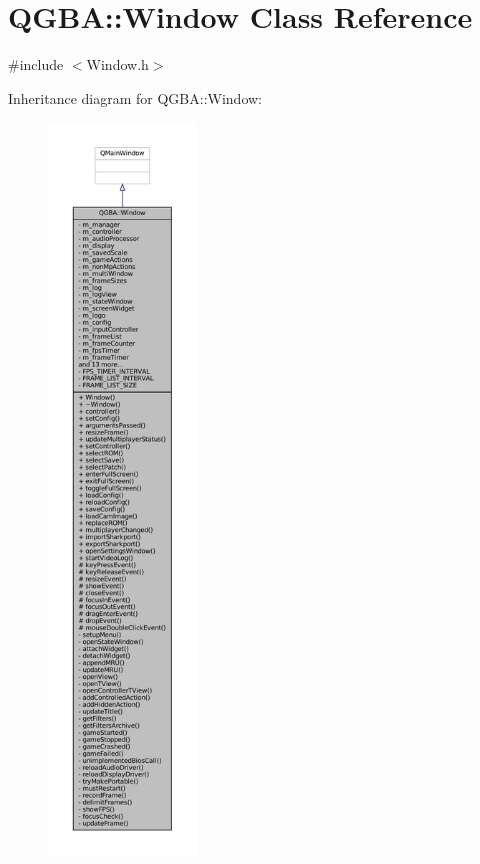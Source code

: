 \hypertarget{class_q_g_b_a_1_1_window}{}\section{Q\+G\+BA\+:\+:Window Class Reference}
\label{class_q_g_b_a_1_1_window}


{\ttfamily \#include $<$Window.\+h$>$}



Inheritance diagram for Q\+G\+BA\+:\+:Window\+:
\nopagebreak
\begin{figure}[H]
\begin{center}
\leavevmode
\includegraphics[height=550pt]{class_q_g_b_a_1_1_window__inherit__graph}
\end{center}
\end{figure}


